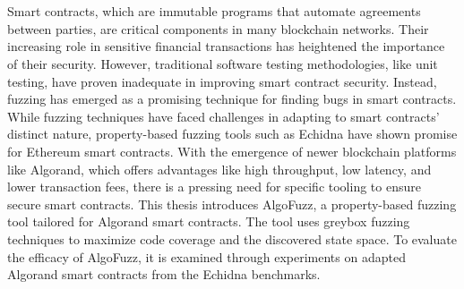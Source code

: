 \chapter{\abstractname}
Smart contracts, which are immutable programs that automate agreements between parties, are critical components in many blockchain networks. Their increasing role in sensitive financial transactions has heightened the importance of their security.
However, traditional software testing methodologies, like unit testing, have proven inadequate in improving smart contract security.
Instead, fuzzing has emerged as a promising technique for finding bugs in smart contracts.
While fuzzing techniques have faced challenges in adapting to smart contracts' distinct nature, property-based fuzzing tools such as Echidna have shown promise for Ethereum smart contracts.
With the emergence of newer blockchain platforms like Algorand, which offers advantages like high throughput, low latency, and lower transaction fees, there is a pressing need for specific tooling to ensure secure smart contracts.
This thesis introduces AlgoFuzz, a property-based fuzzing tool tailored for Algorand smart contracts.
The tool uses greybox fuzzing techniques to maximize code coverage and the discovered state space.
To evaluate the efficacy of AlgoFuzz, it is examined through experiments on adapted Algorand smart contracts from the Echidna benchmarks.
